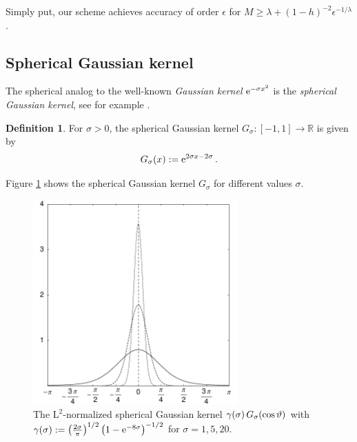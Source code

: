\documentclass[11pt,a4paper,twoside,bibtotoc]{scrartcl}
\theoremstyle{plain}
\theoremstyle{definition}
\newtheorem{definition}[theorem]{Definition}
\theoremstyle{remark}
\newcommand{\R}{\ensuremath{\mathbb{R}}}
\newcommand{\vtheta}{\ensuremath{\vartheta}}
\newcommand{\interv}[4]{\ensuremath{\left#1\left.#2,#3\right#4\right.}}
\newcommand{\fun}[2]{\ensuremath{#1{\hspace{-0.4ex}}\left(#2\right)}}
\newcommand{\paren}[1]{\ensuremath{\left(#1\right)}}
\newcommand{\e}{\mbox{\rm{e}}}
\numberwithin{equation}{section}
\numberwithin{table}{section}
\numberwithin{figure}{section}
\begin{document}
Simply put, our scheme achieves accuracy of order $\epsilon$ for $M \ge
\lambda + (1-h)^{-2} {\epsilon}^{-1/\lambda}$.

\subsection{Spherical Gaussian kernel}
The spherical analog to the well-known \emph{Gaussian kernel} $\e^{-\sigma x^2}$ is the 
\emph{spherical Gaussian kernel}, see for example \cite{bahu01}.
\begin{definition}
  For $\sigma>0$, the spherical Gaussian kernel
  $G_{\sigma}:\interv{[}{-1}{1}{]} \rightarrow \R$ is given by
  \begin{equation}
    \label{GaussKernel}
    \nonumber
    \fun{G_{\sigma}}{x} := \e^{2\sigma x-2\sigma}\,.
  \end{equation}
\end{definition}

Figure \ref{Basics:Figure:GKernel} shows the spherical Gaussian kernel $G_{\sigma}$ for
different values $\sigma$.
\begin{figure}[tb]
  \centering
  \includegraphics[width=0.7\textwidth]{images/gaussian}
  \caption{The $\text{L}^2$-normalized spherical Gaussian kernel 
  $\fun{\gamma}{\sigma} \fun{G_{\sigma}}{\cos\vtheta}$ with
  $\fun{\gamma}{\sigma} := \paren{\frac{2\sigma}{\pi}}^{1/2} \paren{1-\e^{-8\sigma}}^{-1/2}$ for $\sigma = 1,5,20$.}
  \label{Basics:Figure:GKernel}
\end{figure}
\end{document}
